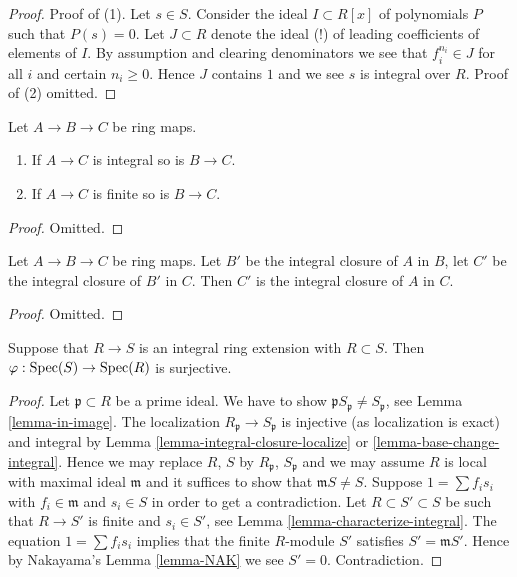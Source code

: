 \begin{proof}
Proof of (1).
Let $s \in S$. Consider the ideal $I \subset R[x]$ of
polynomials $P$ such that $P(s) = 0$. Let $J \subset R$
denote the ideal (!) of leading coefficients of elements of $I$.
By assumption and clearing denominators
we see that $f_i^{n_i} \in J$ for all $i$
and certain $n_i \geq 0$. Hence $J$ contains $1$ and we see
$s$ is integral over $R$. Proof of (2) omitted.
\end{proof}

\begin{lemma}
\label{lemma-integral-permanence}
Let $A \to B \to C$ be ring maps.
\begin{enumerate}
\item If $A \to C$ is integral so is $B \to C$.
\item If $A \to C$ is finite so is $B \to C$.
\end{enumerate}
\end{lemma}

\begin{proof}
Omitted.
\end{proof}

\begin{lemma}
\label{lemma-integral-closure-transitive}
Let $A \to B \to C$ be ring maps.
Let $B'$ be the integral closure of $A$ in $B$,
let $C'$ be the integral closure of $B'$ in $C$. Then
$C'$ is the integral closure of $A$ in $C$.
\end{lemma}

\begin{proof}
Omitted.
\end{proof}

\begin{lemma}
\label{lemma-integral-overring-surjective}
Suppose that $R \to S$ is an integral
ring extension with $R \subset S$.
Then $\varphi : \mathop{\mathrm{Spec}}(S) \to \mathop{\mathrm{Spec}}(R)$
is surjective.
\end{lemma}

\begin{proof}
Let $\mathfrak p \subset R$ be a prime ideal.
We have to show $\mathfrak pS_{\mathfrak p} \not = S_{\mathfrak p}$, see
Lemma \ref{lemma-in-image}.
The localization $R_{\mathfrak p} \to S_{\mathfrak p}$ is injective
(as localization is exact) and integral by
Lemma \ref{lemma-integral-closure-localize} or
\ref{lemma-base-change-integral}.
Hence we may replace $R$, $S$ by $R_{\mathfrak p}$, $S_{\mathfrak p}$ and
we may assume $R$ is local with maximal ideal $\mathfrak m$ and
it suffices to show that $\mathfrak mS \not = S$.
Suppose $1 = \sum f_i s_i$ with $f_i \in \mathfrak m$
and $s_i \in S$ in order to get a contradiction.
Let $R \subset S' \subset S$
be such that $R \to S'$ is finite and $s_i \in S'$, see
Lemma \ref{lemma-characterize-integral}.
The equation $1 = \sum f_i s_i$ implies that
the finite $R$-module $S'$ satisfies $S' = \mathfrak m S'$. Hence by
Nakayama's Lemma \ref{lemma-NAK}
we see $S' = 0$. Contradiction.
\end{proof}

